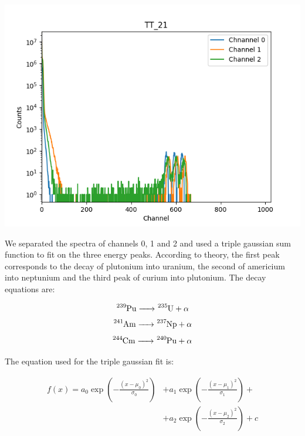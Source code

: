 \documentclass{article}
\begin{document}
\begin{multicols}{2}
\begin{center}
    \label{TT_21}
    \centering
    \includegraphics[scale = 0.6]{images/TT_21.png}
\end{center}

We separated the spectra of channels 0, 1 and 2 and used a triple gaussian sum function to fit on the three energy peaks. According to theory, the first peak corresponds to the decay of plutonium into uranium, the second of americium into neptunium and the third peak of curium into plutonium. The decay equations are:

\begin{equation}
    \ce{ ^{239}Pu -> ^{235}U + \alpha} 
\end{equation}
\begin{equation}
    \ce{ ^{241}Am -> ^{237}Np + \alpha}
\end{equation} 
\begin{equation}
    \ce{ ^{244}Cm -> ^{240}Pu + \alpha}
\end{equation}

The equation used for the triple gaussian fit is:

\begin{equation}
    \begin{split}
    f(x) = a_0\exp{\left(-\frac{(x-\mu_0)^2}{\sigma_0}\right)} &+ a_1\exp{\left(-\frac{(x-\mu_1)^2}{\sigma_1}\right)} + \\
    &+ a_2\exp{\left(-\frac{(x-\mu_2)^2}{\sigma_2}\right)} + c
    \end{split}
    \label{eq:califit}
\end{equation}


\end{multicols}
\end{document}
